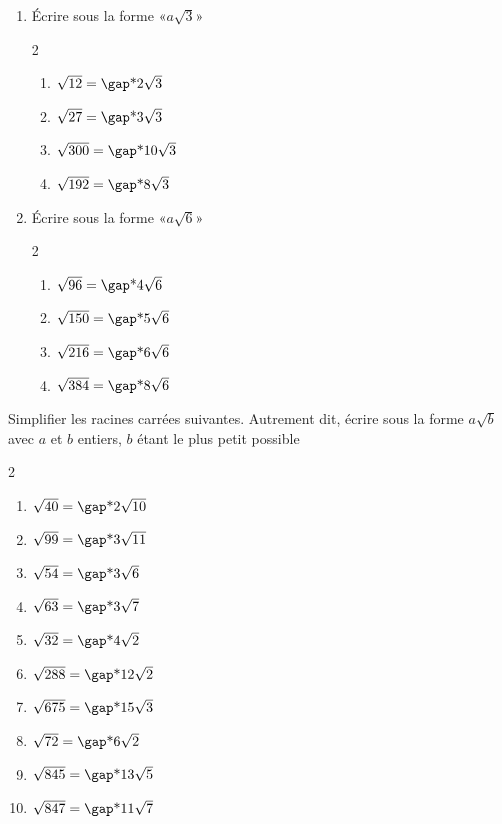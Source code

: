 \documentclass[10pt,a4paper,openany,twoside, eleve]{book}
\begin{document}
\begin{exercicesnofoot}
	\columnbreak
	\begin{exo}
		\begin{enumerate}
			\item Écrire sous la forme «$a\sqrt{3}$»
		\begin{multicols}{2}
			\begin{enumerate}[label={}]
				\item $\sqrt{12} = \troum{2\sqrt{3}}$
				\item $\sqrt{27} = \troum{3\sqrt{3}}$
				\item $\sqrt{300} = \troum{10\sqrt{3}}$
				\item $\sqrt{192} = \troum{8\sqrt{3}}$
				\end{enumerate}
		\end{multicols}
			\item Écrire sous la forme «$a\sqrt{6}$»
		\begin{multicols}{2}
			\begin{enumerate}[label={}]
					\item $\sqrt{96} = \troum{4\sqrt{6}}$
					\item $\sqrt{150} = \troum{5\sqrt{6}}$
					\item $\sqrt{216} = \troum{6\sqrt{6}}$
					\item $\sqrt{384} = \troum{8\sqrt{6}}$
			\end{enumerate}
		\end{multicols}
		\end{enumerate}
	\end{exo}
	\begin{exo}{ Simplifier les racines carrées suivantes. Autrement dit, écrire sous la forme $a\sqrt{b}$ avec $a$ et $b$ entiers, $b$ étant le plus petit possible
		\begin{multicols}{2}
			\begin{enumerate}[label={}]
					\item $\sqrt{40} = \troum{2\sqrt{10}}$
					\item $\sqrt{99} = \troum{3\sqrt{11}}$
					\item $\sqrt{54} = \troum{3\sqrt{6}}$
					\item $\sqrt{63} = \troum{3\sqrt{7}}$
					\item $\sqrt{32} = \troum{4\sqrt{2}}$
					\item $\sqrt{288} = \troum{12\sqrt{2}}$
					\item $\sqrt{675} = \troum{15\sqrt{3}}$
					\item $\sqrt{72} = \troum{6\sqrt{2}}$
					\item $\sqrt{845} = \troum{13\sqrt{5}}$
					\item $\sqrt{847} = \troum{11\sqrt{7}}$
			\end{enumerate}
		\end{multicols}
	}
	\end{exo}


\end{exercicesnofoot}
\end{document}
